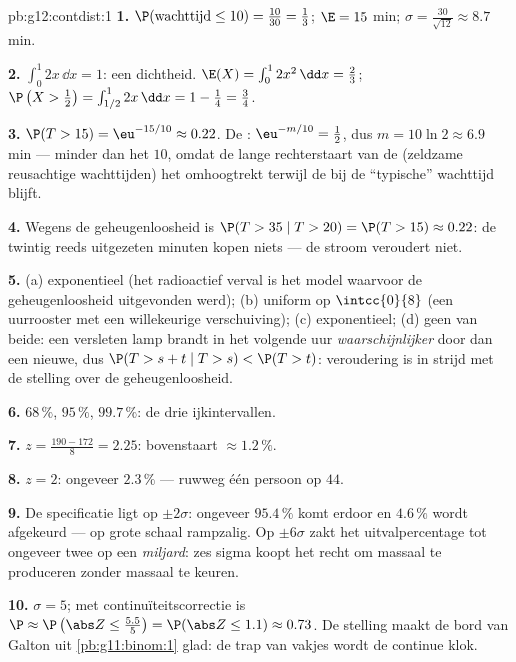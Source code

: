 \begin{solution}{pb:g12:contdist:1}
\textbf{1.} $\P(\text{wachttijd} \leq 10) = \frac{10}{30} = \frac13$;
$\E = 15$ min; $\sigma = \frac{30}{\sqrt{12}} \approx 8.7$ min.

\textbf{2.} $\int_0^1 2x\,\dd x = 1$: een dichtheid.
$\E(X) = \int_0^1 2x^2\,\dd x = \frac23$;
$\P\left(X > \frac12\right) = \int_{1/2}^1 2x\,\dd x = 1 - \frac14 =
\frac34$.

\textbf{3.} $\P(T > 15) = \eu^{-15/10} \approx 0.22$. De :
$\eu^{-m/10} = \frac12$, dus $m = 10\ln 2 \approx 6.9$ min --- minder dan het
 $10$, omdat de lange rechterstaart van de 
(zeldzame reusachtige wachttijden) het  omhoogtrekt terwijl de
 bij de ``typische'' wachttijd blijft.

\textbf{4.} Wegens de geheugenloosheid is
$\P(T > 35 \mid T > 20) = \P(T > 15) \approx 0.22$: de twintig reeds
uitgezeten minuten kopen niets --- de stroom veroudert niet.

\textbf{5.} (a) exponentieel (het radioactief verval is het model waarvoor de
geheugenloosheid uitgevonden werd); (b) uniform op $\intcc{0}{8}$ (een
uurrooster met een willekeurige verschuiving); (c) exponentieel; (d) geen van
beide: een versleten lamp brandt in het volgende uur \emph{waarschijnlijker}
door dan een nieuwe, dus $\P(T > s + t \mid T > s) < \P(T > t)$: veroudering
is in strijd met de stelling over de geheugenloosheid.

\textbf{6.} $68\,\%$, $95\,\%$, $99.7\,\%$: de drie ijkintervallen.

\textbf{7.} $z = \frac{190 - 172}{8} = 2.25$: bovenstaart $\approx 1.2\,\%$.

\textbf{8.} $z = 2$: ongeveer $2.3\,\%$ --- ruwweg één persoon op $44$.

\textbf{9.} De specificatie ligt op $\pm 2\sigma$: ongeveer $95.4\,\%$ komt
erdoor en $4.6\,\%$ wordt afgekeurd --- op grote schaal rampzalig. Op
$\pm 6\sigma$ zakt het uitvalpercentage tot ongeveer twee op een
\emph{miljard}: zes sigma koopt het recht om massaal te produceren zonder
massaal te keuren.

\textbf{10.} $\sigma = 5$; met continuïteitscorrectie is
$\P \approx \P\left(\abs Z \leq \frac{5.5}{5}\right) = \P(\abs Z \leq 1.1)
\approx 0.73$. De stelling maakt de bord van Galton uit
\cref{pb:g11:binom:1} glad: de trap van vakjes wordt de continue klok.


\end{solution}
